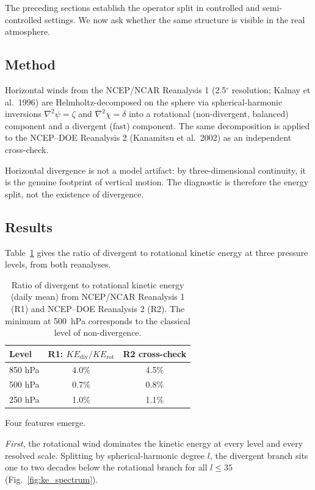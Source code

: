 \documentclass[11pt]{article}
\begin{document}
The preceding sections establish the operator split in controlled and
semi-controlled settings. We now ask whether the same structure is visible in the
real atmosphere.

\subsection{Method}

Horizontal winds from the NCEP/NCAR Reanalysis 1 (2.5$^\circ$ resolution; Kalnay
et al.\ 1996) are Helmholtz-decomposed on the sphere via spherical-harmonic
inversions $\nabla^2\psi = \zeta$ and $\nabla^2\chi = \delta$ into a rotational
(non-divergent, balanced) component and a divergent (fast) component. The same
decomposition is applied to the NCEP--DOE Reanalysis 2 (Kanamitsu et al.\ 2002) as
an independent cross-check.

Horizontal divergence is not a model artifact: by three-dimensional continuity, it
is the genuine footprint of vertical motion. The diagnostic is therefore the
energy split, not the existence of divergence.

\subsection{Results}

Table~\ref{tab:reanalysis} gives the ratio of divergent to rotational kinetic
energy at three pressure levels, from both reanalyses.

\begin{table}[t]
\centering
\caption{Ratio of divergent to rotational kinetic energy (daily mean) from
NCEP/NCAR Reanalysis 1 (R1) and NCEP--DOE Reanalysis 2 (R2). The minimum at
500~hPa corresponds to the classical level of non-divergence.}
\label{tab:reanalysis}
\begin{tabular}{lcc}
\toprule
Level & R1: $KE_{\mathrm{div}}/KE_{\mathrm{rot}}$ &
R2 cross-check \\
\midrule
850 hPa & 4.0\% & 4.5\% \\
500 hPa & 0.7\% & 0.8\% \\
250 hPa & 1.0\% & 1.1\% \\
\bottomrule
\end{tabular}
\end{table}

Four features emerge.

\emph{First}, the rotational wind dominates the kinetic energy at every level and
every resolved scale. Splitting by spherical-harmonic degree $l$, the divergent
branch sits one to two decades below the rotational branch for all $l \leq 35$
(Fig.~\ref{fig:ke_spectrum}).
\end{document}
